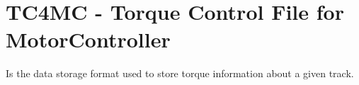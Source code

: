 \section{TC4MC - Torque Control File for MotorController}

Is the data storage format used to store torque information about a given track.